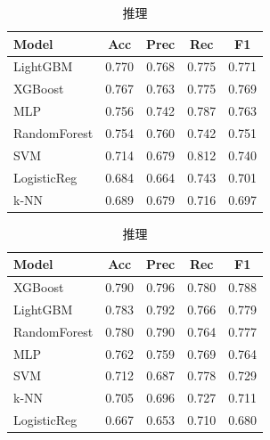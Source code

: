 \documentclass[uplatex, dvipdfmx, 11pt, a4paper, report]{jsbook}
\begin{document}
\begin{table}[H]
  \small
  \begin{minipage}[t]{0.49\textwidth}
    \centering
    \caption{歴史}
    \begin{tabular}{l|c|c|c|c} \hline
      Model & Acc & Prec & Rec & F1 \\ \hline
      LightGBM & 0.770 & 0.768 & 0.775 & 0.771 \\
      XGBoost & 0.767 & 0.763 & 0.775 & 0.769 \\
      MLP & 0.756 & 0.742 & 0.787 & 0.763 \\
      RandomForest & 0.754 & 0.760 & 0.742 & 0.751 \\
      SVM & 0.714 & 0.679 & 0.812 & 0.740 \\
      LogisticReg & 0.684 & 0.664 & 0.743 & 0.701 \\
      k-NN & 0.689 & 0.679 & 0.716 & 0.697 \\ \hline
    \end{tabular}
  \end{minipage}
  \hfill
  \begin{minipage}[t]{0.49\textwidth}
    \centering
    \caption{推理}
    \begin{tabular}{l|c|c|c|c} \hline
      Model & Acc & Prec & Rec & F1 \\ \hline
      XGBoost & 0.790 & 0.796 & 0.780 & 0.788 \\
      LightGBM & 0.783 & 0.792 & 0.766 & 0.779 \\
      RandomForest & 0.780 & 0.790 & 0.764 & 0.777 \\
      MLP & 0.762 & 0.759 & 0.769 & 0.764 \\
      SVM & 0.712 & 0.687 & 0.778 & 0.729 \\
      k-NN & 0.705 & 0.696 & 0.727 & 0.711 \\
      LogisticReg & 0.667 & 0.653 & 0.710 & 0.680 \\ \hline
    \end{tabular}
  \end{minipage}
\end{table}
\end{document}

